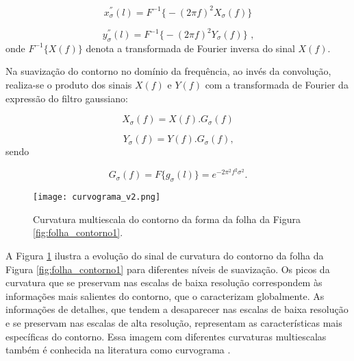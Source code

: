 \begin{equation}
x_{\sigma}^{''}(l) = F^{-1}\big\{- (2 \pi f)^2 X_{\sigma}(f)\big\}
\end{equation}

\begin{equation}
y_{\sigma}^{''}(l) = F^{-1}\big\{- (2 \pi f)^2 Y_{\sigma}(f)\big\}\text{ ,}
\end{equation} 
\noindent onde $F^{-1}\big\{X(f)\big\}$ denota a transformada de Fourier inversa do sinal $X(f)$.

\begin{comment}
\begin{equation}
X(f) = F\big\{x(l)\big\} = \int\limits^\infty_\infty x(l)e^{-2 \pi j f l}dl
\end{equation}

\begin{equation}
x(l) = F^{-1}\big\{X(f)\big\} \int\limits^\infty_\infty X(f)e^{2 \pi j f l}df
\end{equation}
\end{comment}

Na suavização do contorno no domínio da frequência, ao invés da convolução, realiza-se o produto dos sinais $X(f)$ e $Y(f)$ com a transformada de Fourier da expressão do filtro gaussiano:

\begin{equation}
X_\sigma(f) = X(f).G_\sigma(f)
\end{equation}

\begin{equation}
Y_\sigma(f) = Y(f).G_\sigma(f)\text{,}
\end{equation} 
\noindent sendo

\begin{equation}
G_\sigma(f) = F\big\{ g_{\sigma}(l)\big\} = e^{-2 \pi^2 f^2 \sigma^2}\text{.}
\end{equation}

\begin{figure}[h!]
  \caption{\label{fig:curv_ms} Curvatura multiescala do contorno da forma da folha da Figura \ref{fig:folha_contorno1}.}
  \centering
  \texttt{[image: curvograma\_v2.png]}
 \end{figure}

A Figura \ref{fig:curv_ms} ilustra a evolução do sinal de curvatura do contorno da folha da Figura \ref{fig:folha_contorno1} para diferentes níveis de suavização. Os picos da curvatura que se preservam nas escalas de baixa resolução correspondem às informações mais salientes do contorno, que o caracterizam globalmente. As informações de detalhes, que tendem a desaparecer nas escalas de baixa resolução e se preservam nas escalas de alta resolução, representam as características mais específicas do contorno. Essa imagem com diferentes curvaturas multiescalas também é conhecida na literatura como curvograma \cite{Cesar:1996}.


